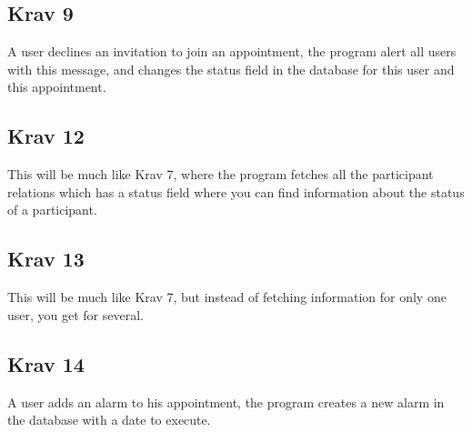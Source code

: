 \subsection{Krav 9}
A user declines an invitation to join an appointment, the program alert all users with this message, and changes the status field in the database for this user and this appointment.

\subsection{Krav 12}
This will be much like Krav 7, where the program fetches all the participant relations which has a status field where you can find information about the status of a participant.

\subsection{Krav 13}
This will be much like Krav 7, but instead of fetching information for only one user, you get for several.

\subsection{Krav 14}
A user adds an alarm to his appointment, the program creates a new alarm in the database with a date to execute.

